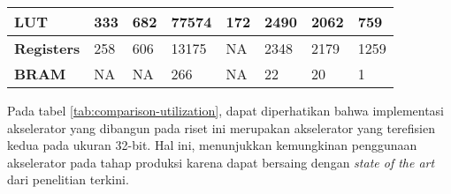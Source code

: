 \begin{table}[h]
\begin{tabularx}{\textwidth}{|p{20mm}|X|X|X|X|X|X|X|}
		\textbf{LUT}                  & 333                                                              & 682                                             & 77574                                      & 172                                                                & 2490              & 2062   & 759    \\ \hline
		\textbf{Registers}            & 258                                                              & 606                                             & 13175                                      & NA                                                                 & 2348              & 2179   & 1259   \\ \hline
		\textbf{BRAM}                 & NA                                                               & NA                                              & 266                                        & NA                                                                 & 22                & 20     & 1      \\ \hline
	\end{tabularx}
\end{table}

Pada tabel \ref{tab:comparison-utilization}, dapat diperhatikan bahwa implementasi akselerator yang dibangun pada riset ini merupakan akselerator yang terefisien kedua pada ukuran 32-bit. Hal ini, menunjukkan kemungkinan penggunaan akselerator pada tahap produksi karena dapat bersaing dengan \textit{state of the art} dari penelitian terkini.
